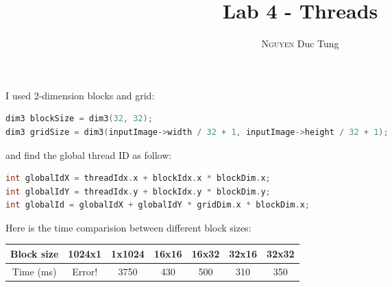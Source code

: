 \documentclass[12pt]{article}
\title{Lab 4 - Threads}
\author{\textsc{Nguyen} Duc Tung}
\date{}
\begin{document}
\maketitle

I used 2-dimension blocks and grid:

\begin{lstlisting}[language=C]
dim3 blockSize = dim3(32, 32);
dim3 gridSize = dim3(inputImage->width / 32 + 1, inputImage->height / 32 + 1);
\end{lstlisting}

and find the global thread ID as follow:

\begin{lstlisting}[language=C]
int globalIdX = threadIdx.x + blockIdx.x * blockDim.x;
int globalIdY = threadIdx.y + blockIdx.y * blockDim.y;
int globalId = globalIdX + globalIdY * gridDim.x * blockDim.x;
\end{lstlisting}

Here is the time comparision between different block sizes:

\begin{table}[h]
\centering
\begin{tabular}{||c|c|c|c|c|c|c||}
\hline
Block size & 1024x1 & 1x1024 & 16x16 & 16x32 & 32x16 & 32x32 \\ \hline
Time (ms)  & Error! & 3750   & 430   & 500   & 310   & 350   \\
\hline
\end{tabular}
\end{table}
\end{document}
